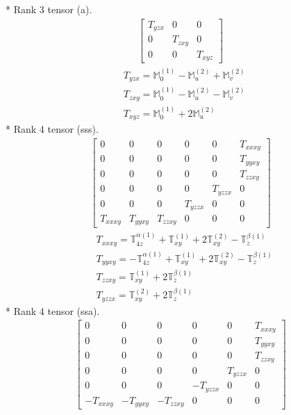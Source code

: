 \documentclass[fleqn,8pt,landscape]{jsarticle}
\begin{document}
* Rank 3 tensor (a).
\begin{align*}
\begin{bmatrix} T_{yzx} & 0 & 0 \\ 0 & T_{zxy} & 0 \\ 0 & 0 & T_{xyz} \end{bmatrix}
\end{align*}
\begin{align*}
& T_{yzx} = \mathbb{M}_{0}^{(1)} - \mathbb{M}_{u}^{(2)} + \mathbb{M}_{v}^{(2)} \\
& T_{zxy} = \mathbb{M}_{0}^{(1)} - \mathbb{M}_{u}^{(2)} - \mathbb{M}_{v}^{(2)} \\
& T_{xyz} = \mathbb{M}_{0}^{(1)} + 2 \mathbb{M}_{u}^{(2)}
\end{align*}
* Rank 4 tensor (sss).
\begin{align*}
\begin{bmatrix} 0 & 0 & 0 & 0 & 0 & T_{xxxy} \\ 0 & 0 & 0 & 0 & 0 & T_{yyxy} \\ 0 & 0 & 0 & 0 & 0 & T_{zzxy} \\ 0 & 0 & 0 & 0 & T_{yzzx} & 0 \\ 0 & 0 & 0 & T_{yzzx} & 0 & 0 \\ T_{xxxy} & T_{yyxy} & T_{zzxy} & 0 & 0 & 0 \end{bmatrix}
\end{align*}
\begin{align*}
& T_{xxxy} = \mathbb{T}_{4z}^{\alpha(1)} + \mathbb{T}_{xy}^{(1)} + 2 \mathbb{T}_{xy}^{(2)} - \mathbb{T}_{z}^{\beta(1)} \\
& T_{yyxy} = - \mathbb{T}_{4z}^{\alpha(1)} + \mathbb{T}_{xy}^{(1)} + 2 \mathbb{T}_{xy}^{(2)} - \mathbb{T}_{z}^{\beta(1)} \\
& T_{zzxy} = \mathbb{T}_{xy}^{(1)} + 2 \mathbb{T}_{z}^{\beta(1)} \\
& T_{yzzx} = \mathbb{T}_{xy}^{(2)} + 2 \mathbb{T}_{z}^{\beta(1)}
\end{align*}
* Rank 4 tensor (ssa).
\begin{align*}
\begin{bmatrix} 0 & 0 & 0 & 0 & 0 & T_{xxxy} \\ 0 & 0 & 0 & 0 & 0 & T_{yyxy} \\ 0 & 0 & 0 & 0 & 0 & T_{zzxy} \\ 0 & 0 & 0 & 0 & T_{yzzx} & 0 \\ 0 & 0 & 0 & - T_{yzzx} & 0 & 0 \\ - T_{xxxy} & - T_{yyxy} & - T_{zzxy} & 0 & 0 & 0 \end{bmatrix}
\end{align*}
\end{document}
